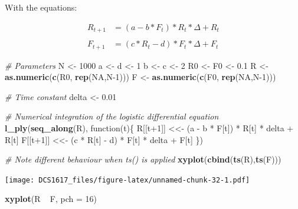 \documentclass[]{book}
\newenvironment{Shaded}{\begin{snugshade}}{\end{snugshade}}
\newcommand{\KeywordTok}[1]{\textcolor[rgb]{0.13,0.29,0.53}{\textbf{{#1}}}}
\newcommand{\DataTypeTok}[1]{\textcolor[rgb]{0.13,0.29,0.53}{{#1}}}
\newcommand{\DecValTok}[1]{\textcolor[rgb]{0.00,0.00,0.81}{{#1}}}
\newcommand{\FloatTok}[1]{\textcolor[rgb]{0.00,0.00,0.81}{{#1}}}
\newcommand{\StringTok}[1]{\textcolor[rgb]{0.31,0.60,0.02}{{#1}}}
\newcommand{\CommentTok}[1]{\textcolor[rgb]{0.56,0.35,0.01}{\textit{{#1}}}}
\newcommand{\OtherTok}[1]{\textcolor[rgb]{0.56,0.35,0.01}{{#1}}}
\newcommand{\NormalTok}[1]{{#1}}
\begin{document}
With the equations:

\begin{align}
R_{t+1} &=  (a-b*F_t)*R_t * \Delta + R_t \\
\\
F_{t+1} &=  (c*R_t-d)*F_t * \Delta + F_t
\end{align}

\begin{Shaded}
\begin{Highlighting}[]
\CommentTok{# Parameters}
\NormalTok{N  <-}\StringTok{ }\DecValTok{1000}
\NormalTok{a  <-}\StringTok{ }\NormalTok{d <-}\StringTok{ }\DecValTok{1}
\NormalTok{b  <-}\StringTok{ }\NormalTok{c <-}\StringTok{ }\DecValTok{2} 
\NormalTok{R0 <-}\StringTok{ }\NormalTok{F0 <-}\StringTok{ }\FloatTok{0.1}
\NormalTok{R  <-}\StringTok{ }\KeywordTok{as.numeric}\NormalTok{(}\KeywordTok{c}\NormalTok{(R0, }\KeywordTok{rep}\NormalTok{(}\OtherTok{NA}\NormalTok{,N}\DecValTok{-1}\NormalTok{)))}
\NormalTok{F  <-}\StringTok{ }\KeywordTok{as.numeric}\NormalTok{(}\KeywordTok{c}\NormalTok{(F0, }\KeywordTok{rep}\NormalTok{(}\OtherTok{NA}\NormalTok{,N}\DecValTok{-1}\NormalTok{)))}

\CommentTok{# Time constant}
\NormalTok{delta <-}\StringTok{ }\FloatTok{0.01}

\CommentTok{# Numerical integration of the logistic differential equation}
\KeywordTok{l_ply}\NormalTok{(}\KeywordTok{seq_along}\NormalTok{(R), function(t)\{}
    \NormalTok{R[[t}\DecValTok{+1}\NormalTok{]] <<-}\StringTok{ }\NormalTok{(a -}\StringTok{ }\NormalTok{b *}\StringTok{ }\NormalTok{F[t]) *}\StringTok{ }\NormalTok{R[t] *}\StringTok{ }\NormalTok{delta +}\StringTok{ }\NormalTok{R[t] }
    \NormalTok{F[[t}\DecValTok{+1}\NormalTok{]] <<-}\StringTok{ }\NormalTok{(c *}\StringTok{ }\NormalTok{R[t] -}\StringTok{ }\NormalTok{d) *}\StringTok{ }\NormalTok{F[t] *}\StringTok{ }\NormalTok{delta +}\StringTok{ }\NormalTok{F[t] }
    \NormalTok{\})}

\CommentTok{# Note different behaviour when ts() is applied}
\KeywordTok{xyplot}\NormalTok{(}\KeywordTok{cbind}\NormalTok{(}\KeywordTok{ts}\NormalTok{(R),}\KeywordTok{ts}\NormalTok{(F)))}
\end{Highlighting}
\end{Shaded}

\texttt{[image: DCS1617\_files/figure-latex/unnamed-chunk-32-1.pdf]}

\begin{Shaded}
\begin{Highlighting}[]
\KeywordTok{xyplot}\NormalTok{(R ~}\StringTok{ }\NormalTok{F, }\DataTypeTok{pch =} \DecValTok{16}\NormalTok{)}
\end{Highlighting}
\end{Shaded}
\end{document}
